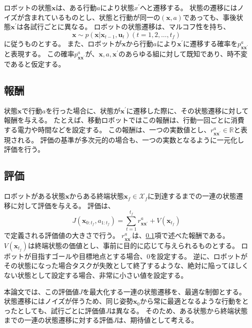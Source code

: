 ロボットの状態$\bm{x}$は、ある行動$a$により状態$x^{\prime}$へと遷移する。
状態の遷移にはノイズが含まれているものとし、状態と行動が同一の$(\bm{x}, a)$であっても、事後状態$\bm{x}^{\prime}$は各試行ごとに異なる。
ロボットの状態遷移は、マルコフ性を持ち、
\begin{equation}
\label{trans prob}
  \bm{x} \sim p(\bm{x} | \bm{x}_{t-1}, \bm{u}_t) (t=1,2,\ldots,t_{f})
\end{equation}
に従うものとする。
また、ロボットが$\bm{x}$から行動$a$により$\bm{x}^{\prime}$に遷移する確率を$p^{a}_{\bm{x}\bm{x}^{\prime}}$と表現する。
この確率$p^{a}_{\bm{x}\bm{x}^{\prime}}$が、$\bm{x}, a, \bm{x}^{\prime}$のあらゆる組に対して既知であり、時不変であると仮定する。

\subsection{報酬} \label{subsection:reward}
状態$\bm{x}$で行動$a$を行った場合に、状態が$\bm{x}^{\prime}$に遷移した際に、その状態遷移に対して報酬を与える。
たとえば、移動ロボットではこの報酬は、行動一回ごとに消費する電力や時間などを設定する。
この報酬は、一つの実数値とし、$r^{a}_{\bm{x}\bm{x}^{\prime}} \in \mathbb{R}$と表現される。
評価の基準が多次元的の場合も、一つの実数となるように一元化し評価を行う。

\subsection{評価}
ロボットがある状態$\bm{x}$からある終端状態$\bm{x}_{f} \in \mathcal{X}_{f}$に到達するまでの一連の状態遷移に対して評価を与える。
評価は、
\begin{equation}
\label{evaluation}
  J( \bm{x}_{0:t_{f}}, a_{1:t_{f}} ) = \sum^{t_{f}}_{t=1} r^{a}_{\bm{x}\bm{x}^{\prime}} + V(\bm{x}_{t_{f}})
\end{equation}
で定義される評価値の大きさで行う。
$r^{a}_{\bm{x}\bm{x}^{\prime}}$は、\ref{subsection:reward}項で述べた報酬である。
$V(\bm{x}_{t_{f}})$は終端状態の価値とし、事前に目的に応じて与えられるものとする。
ロボットが目指すゴールや目標地点とする場合、$0$を設定する。
逆に、ロボットがその状態になった場合タスクが失敗として終了するような、絶対に陥ってほしくない状態として設定する場合、非常に小さい値を設定する。

本論文では、この評価値$J$を最大化する一連の状態遷移を、最適な制御とする。
状態遷移にはノイズが伴うため、同じ姿勢$\bm{x}_{0}$から常に最適となるような行動をとったとしても、試行ごとに評価値$J$は異なる。
そのため、ある状態から終端状態までの一連の状態遷移に対する評価$J$は、期待値として考える。

